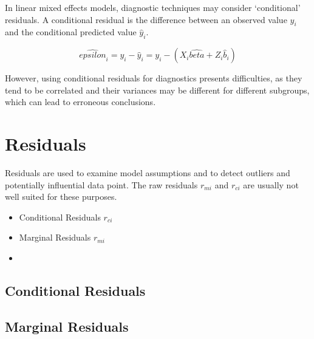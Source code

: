 \documentclass[main.tex]{subfiles}
\begin{document}
	In linear mixed effects models, diagnostic techniques may consider `conditional' residuals. A conditional residual is the difference between an observed value $y_{i}$ and the conditional predicted value $\hat{y}_{i} $.
	
	\[ \hat{epsilon}_{i} = y_{i} - \hat{y}_{i} = y_{i} - ( X_{i}\hat{beta} + Z_{i}\hat{b}_{i}) \]
	
	However, using conditional residuals for diagnostics presents difficulties, as they tend to be correlated and their variances may be different for different subgroups, which can lead to erroneous conclusions.
	
	
	
	
	
	
	\section*{Residuals}
	
	Residuals are used to examine model assumptions and to detect outliers and potentially influential data
	point. The raw residuals $r_{mi}$ and $r_{ci}$ are usually not well suited for these purposes.
	
	\begin{itemize}
		\item Conditional Residuals $r_{ci}$
		\item Marginal Residuals $r_{mi}$
		\item 
	\end{itemize}
	\subsection*{Conditional Residuals}
	
	\subsection*{Marginal Residuals}
	
\end{document}
